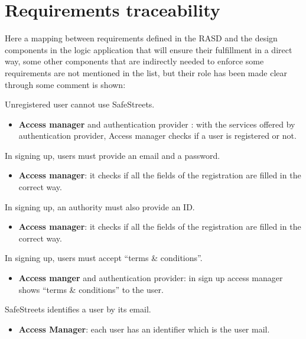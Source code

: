 \documentclass[../RASD.tex]{subfiles}
\begin{document}
    \chapter{Requirements traceability}\label{ch:requirements-traceability}
    Here a mapping between requirements defined in the RASD and the design components in the logic application that will ensure their fulfillment in a direct way, some other components that are indirectly needed to enforce some requirements are not mentioned in the list, but their role has been made clear through some comment is shown:
    \begin{enumerate}
         Unregistered user cannot use SafeStreets.
        \begin{itemize}
            \item \textbf{Access manager} and authentication provider : with the services offered by authentication provider, Access manager checks if a user is registered or not.
        \end{itemize}

         In signing up, users must provide an email and a password.
        \begin{itemize}
            \item \textbf{Access manager}: it checks if all the fields of the registration are filled in the correct way.
        \end{itemize}

         In signing up, an authority must also provide an ID.
        \begin{itemize}
            \item \textbf{Access manager}: it checks if all the fields of the registration are filled in the correct way.
        \end{itemize}

         In signing up, users must accept “terms \& conditions”.
        \begin{itemize}
            \item \textbf{Access manger} and authentication provider: in sign up access manager shows “terms \& conditions” to the user.
        \end{itemize}

         SafeStreets identifies a user by its email.
        \begin{itemize}
            \item \textbf{Access Manager}: each user has an identifier which is the user mail.
        \end{itemize}


\end{enumerate}
\end{document}
